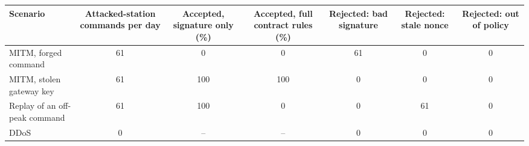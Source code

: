 \begin{tabular}{@{}lcccccc@{}}
\toprule
Scenario & Attacked-station commands per day & Accepted, signature only (\%) & Accepted, full contract rules (\%) & Rejected: bad signature & Rejected: stale nonce & Rejected: out of policy \\
\midrule
MITM, forged command & 61 & 0 & 0 & 61 & 0 & 0 \\
MITM, stolen gateway key & 61 & 100 & 100 & 0 & 0 & 0 \\
Replay of an off-peak command & 61 & 100 & 0 & 0 & 61 & 0 \\
DDoS & 0 & -- & -- & 0 & 0 & 0 \\
\bottomrule
\end{tabular}